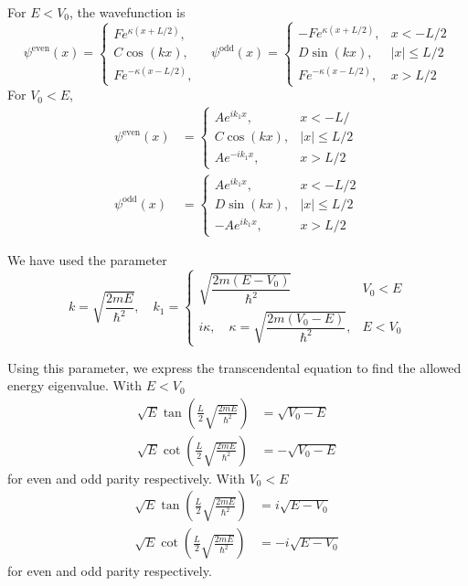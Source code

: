 \documentclass[../../../main.tex]{subfiles}
\begin{document}
For $E<V_0$, the wavefunction is
\begin{equation*}
    \psi^{\text{even}}(x) =
    \begin{cases}
        F e^{\kappa (x + L/2)}, \\
        C \cos(k x),            \\
        F e^{-\kappa (x - L/2)},
    \end{cases}
    \quad
    \psi^{\text{odd}}(x) =
    \begin{cases}
        - F e^{\kappa (x + L/2)}, & x < -L/2    \\
        D \sin(k x),              & |x| \le L/2 \\
        F e^{-\kappa (x - L/2)},  & x > L/2
    \end{cases}
\end{equation*}
For $V_0<E$,
\begin{align*}
    \psi^{\text{even}}(x) & =
    \begin{cases}
        A e^{i k_1 x} , & x < -L/     \\
        C \cos(k x),    & |x| \le L/2 \\
        A e^{-i k_1 x}, & x > L/2
    \end{cases}
    \\
    \psi^{\text{odd}}(x)  & =
    \begin{cases}
        A e^{i k_1 x},   & x < -L/2    \\
        D \sin(k x),     & |x| \le L/2 \\
        -A e^{i k_1 x} , & x > L/2
    \end{cases}
\end{align*}

We have used the parameter
\begin{equation*}
    k = \sqrt{\frac{2 m E}{\hbar^2}}, \quad
    k_1 =
    \begin{cases}
        \sqrt{\dfrac{2 m (E - V_0)}{\hbar^2}}                           & V_0<E   \\
        i \kappa, \quad \kappa = \sqrt{\dfrac{2 m (V_0 - E)}{\hbar^2}}, & E < V_0
    \end{cases}
\end{equation*}

Using this parameter, we express the transcendental equation to find the allowed energy eigenvalue.
With $E<V_0$ 
\begin{align*}
    \sqrt{E} \tan \left( \frac{L }{2 }\sqrt{\frac{2mE}{\hbar^2}} \right) &= \sqrt{V_0-E}\\
    \sqrt{E} \cot \left( \frac{L }{2 }\sqrt{\frac{2mE}{\hbar^2}} \right) &= -\sqrt{V_0-E}
\end{align*}
for even and odd parity respectively.
With $V_0<E$
\begin{align*}
    \sqrt{E} \tan \left( \frac{L }{2 }\sqrt{\frac{2mE}{\hbar^2}} \right) &= i\sqrt{E-V_0}\\
    \sqrt{E} \cot \left( \frac{L }{2 }\sqrt{\frac{2mE}{\hbar^2}} \right) &= -i\sqrt{E-V_0}
\end{align*}
for even and odd parity respectively.
\end{document}
